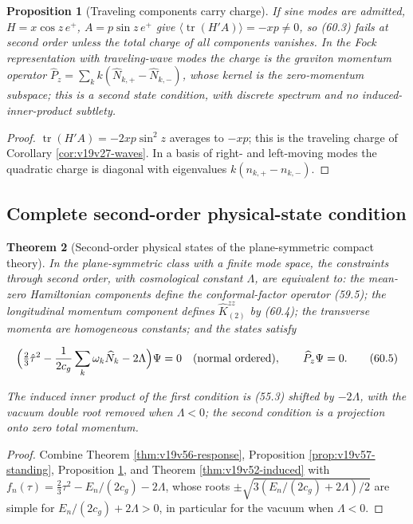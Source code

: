 \documentclass[11pt]{article}
\newtheorem{theorem}{Theorem}[section]
\newtheorem{proposition}[theorem]{Proposition}
\theoremstyle{remark}
\begin{document}
\begin{proposition}[Traveling components carry charge]
\label{prop:v19v57-traveling}
If sine modes are admitted, \(H=x\cos z\,e^+\), \(A=p\sin z\,e^+\)
give \(\langle\operatorname{tr}(H'A)\rangle=-xp\neq0\), so (60.3)
fails at second order unless the total charge of all components
vanishes.  In the Fock representation with traveling-wave modes the
charge is the graviton momentum operator
\(\widehat P_z=\sum_kk(\widehat N_{k,+}-\widehat N_{k,-})\), whose
kernel is the zero-momentum subspace; this is a second state condition,
with discrete spectrum and no induced-inner-product subtlety.
\end{proposition}

\begin{proof}
\(\operatorname{tr}(H'A)=-2xp\sin^2z\) averages to \(-xp\); this is
the traveling charge of Corollary \ref{cor:v19v27-waves}.  In a basis
of right- and left-moving modes the quadratic charge is diagonal with
eigenvalues \(k(n_{k,+}-n_{k,-})\).
\end{proof}

\subsection{Complete second-order physical-state condition}

\begin{theorem}[Second-order physical states of the plane-symmetric compact theory]
\label{thm:v19v57-physical}
In the plane-symmetric class with a finite mode space, the constraints
through second order, with cosmological constant \(\Lambda\), are
equivalent to: the mean-zero Hamiltonian components define the
conformal-factor operator (59.5); the longitudinal momentum component
defines \(\widehat K^{zz}_{(2)}\) by (60.4); the transverse momenta are
homogeneous constants; and the states satisfy

\[
 \Bigl(\tfrac23\hat\tau^2-\frac1{2c_g}\sum_k\omega_k\widehat N_k-2\Lambda\Bigr)\Psi=0
 \quad\hbox{(normal ordered)},\qquad
 \widehat P_z\Psi=0.                                                   \tag{60.5}
\]

The induced inner product of the first condition is (55.3) shifted by
\(-2\Lambda\), with the vacuum double root removed when \(\Lambda<0\);
the second condition is a projection onto zero total momentum.
\end{theorem}

\begin{proof}
Combine Theorem \ref{thm:v19v56-response}, Proposition
\ref{prop:v19v57-standing}, Proposition \ref{prop:v19v57-traveling},
and Theorem \ref{thm:v19v52-induced} with \(f_n(\tau)=\tfrac23\tau^2-E_n/(2c_g)-2\Lambda\),
whose roots \(\pm\sqrt{3(E_n/(2c_g)+2\Lambda)/2}\) are simple for
\(E_n/(2c_g)+2\Lambda>0\), in particular for the vacuum when
\(\Lambda<0\).
\end{proof}
\end{document}
